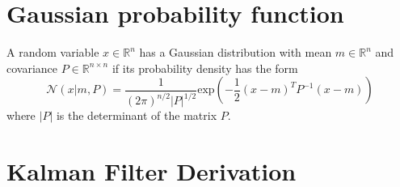 \section{Gaussian probability function}\label{gauss_pdf}
A random variable $x \in \mathbb{R}^n$ has a Gaussian distribution with mean
$m \in \mathbb{R}^n$ and covariance $P \in \mathbb{R}^{n\times n}$ if its
probability density has the form
$$ \mathcal{N}(x | m, P) = \frac{1}{(2\pi)^{n / 2} |P|^{1/2}}
\text{exp} \left( -\frac{1}{2} (x - m)^T P^{-1} (x-m) \right) $$
where $|P|$ is the determinant of the matrix $P$.

\section{Kalman Filter Derivation} \label{KF_appendix}
